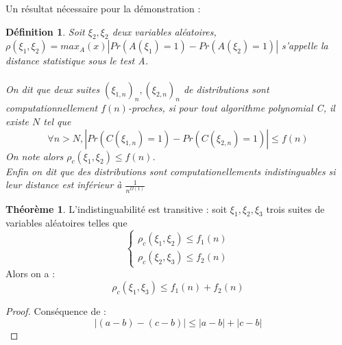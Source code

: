 \documentclass{article}		%
\newtheorem{defi}{Définition}
\theoremstyle{definition}
\newtheorem{theo}{Théorème}
\theoremstyle{plain}
\theoremstyle{plain}
\theoremstyle{plain}
\theoremstyle{plain}
\theoremstyle{plain}
\begin{document}
\begin{framed}
Un résultat nécessaire pour la démonstration :
\begin{defi}
Soit $\xi_2, \xi_2$ deux variables
aléatoires, 
 $\rho(\xi_1,\xi_2)= max_A(x)
|Pr(A(\xi_1)=1)-Pr(A(\xi_2)=1)|$ s'appelle la distance statistique sous
le test A. 
\\\\
On dit que deux suites $(\xi_{1,n})_n, (\xi_{2,n})_n$ de distributions sont computationnellement $f(n)$-proches,
si pour tout algorithme polynomial C, il existe $N$ tel que 
$$\forall n>N, |Pr(C(\xi_{1,n})=1)-Pr(C(\xi_{2,n})=1)|\leq f(n)$$
On note alors $\rho_c(\xi_1,\xi_2) \leq f(n)$.
\\
Enfin on dit que des distributions sont computationellements
indistinguables si leur distance est inférieur à $\frac{1}{n^{\Omega(1)}}$


\end{defi}
\begin{theo}
L'indistinguabilité est transitive : soit $\xi_1,\xi_2,\xi_3$ trois suites de
variables aléatoires telles que 
$$\begin{cases}
\rho_c(\xi_1,\xi_2)\leq f_1(n)\\
\rho_c(\xi_2,\xi_3)\leq f_2(n)
\end{cases}
$$
Alors on a :
$$\rho_c(\xi_1,\xi_3)\leq f_1(n)+f_2(n)$$
\end{theo}

\begin{proof}
Conséquence de : 
$$|(a-b)-(c-b)|\leq|a-b|+|c-b|$$
\end{proof}
\end{framed}
\end{document}
